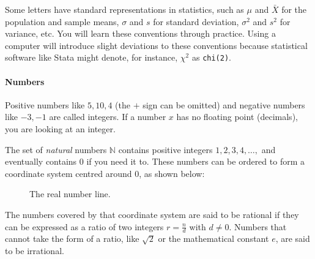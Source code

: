 

Some letters have standard representations in statistics, such as $\mu$ and $\bar X$ for the population and sample means, $\sigma$ and $s$ for standard deviation, $\sigma^2$ and $s^2$ for variance, etc. You will learn these conventions through practice. Using a computer will introduce slight deviations to these conventions because statistical software like Stata might denote, for instance, $\chi^2$ as \texttt{chi(2)}.

%
\paragraph{Numbers}%
%
Positive numbers like $5, 10, 4$ (the $+$ sign can be omitted) and negative numbers like $-3, -1$ are called integers. If a number $x$ has no floating point (decimals), you are looking at an integer.

The set of \emph{natural} numbers $\mathbb{N}$ contains positive integers $1,2,3,4, \ldots, $ and eventually contains $0$ if you need it to. These numbers can be ordered to form a coordinate system centred around $0$, as shown below:

\begin{figure}[h]
  \caption{The real number line.}
\end{figure}

The numbers covered by that coordinate system are said to be rational if they can be expressed as a ratio of two integers $r = \frac{n}{d}$ with $d \neq 0$. Numbers that cannot take the form of a ratio, like $\sqrt{2}$ or the mathematical constant $e$, are said to be irrational.

